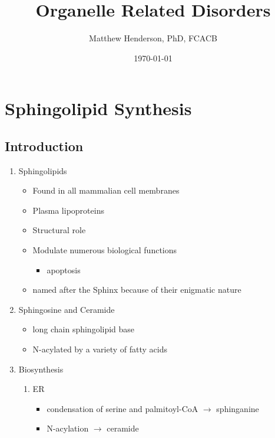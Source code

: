 \documentclass{scrartcl}
\author{Matthew Henderson, PhD, FCACB}
\date{\today}
\title{Organelle Related Disorders}
\begin{document}
\maketitle
\tableofcontents


\section{Sphingolipid Synthesis}
\label{sec:org4aaf625}
\subsection{Introduction}
\label{sec:orgc02aedd}
\begin{enumerate}
\item Sphingolipids
\label{sec:org5fb80ad}
\begin{itemize}
\item Found in all mammalian cell membranes
\item Plasma lipoproteins
\item Structural role
\item Modulate numerous biological functions
\begin{itemize}
\item apoptosis
\end{itemize}
\item named after the Sphinx because of their enigmatic nature
\end{itemize}

\item Sphingosine and Ceramide
\label{sec:org03a20a2}

\begin{itemize}
\item long chain sphingolipid base
\item N-acylated by a variety of fatty acids
\end{itemize}


\item Biosynthesis
\label{sec:org3d653d5}

\begin{enumerate}
\item ER
\label{sec:org03b3856}
\begin{itemize}
\item condensation of serine and palmitoyl-CoA \(\to\) sphinganine
\item N-acylation \(\to\) ceramide
\end{itemize}


\end{enumerate}
\end{enumerate}
\end{document}
